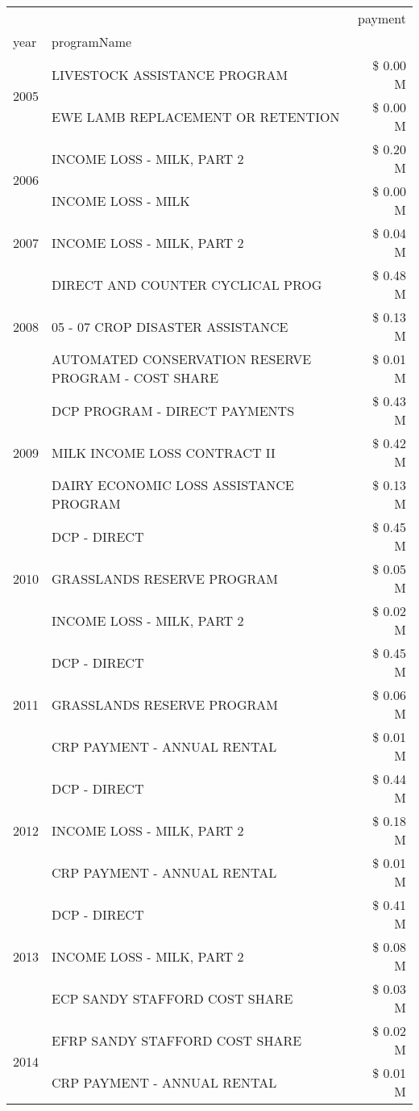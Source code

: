 \begin{tabular}{llr}
\toprule
 &  & payment \\
year & programName &  \\
\midrule
\multirow[t]{2}{*}{2005} & LIVESTOCK ASSISTANCE PROGRAM & \$ 0.00 M \\
 & EWE LAMB REPLACEMENT OR RETENTION & \$ 0.00 M \\
\cline{1-3}
\multirow[t]{2}{*}{2006} & INCOME LOSS - MILK, PART 2 & \$ 0.20 M \\
 & INCOME LOSS - MILK & \$ 0.00 M \\
\cline{1-3}
2007 & INCOME LOSS - MILK, PART 2 & \$ 0.04 M \\
\cline{1-3}
\multirow[t]{3}{*}{2008} & DIRECT AND COUNTER CYCLICAL PROG & \$ 0.48 M \\
 & 05 - 07 CROP DISASTER ASSISTANCE & \$ 0.13 M \\
 & AUTOMATED CONSERVATION RESERVE PROGRAM - COST SHARE & \$ 0.01 M \\
\cline{1-3}
\multirow[t]{3}{*}{2009} & DCP PROGRAM - DIRECT PAYMENTS & \$ 0.43 M \\
 & MILK INCOME LOSS CONTRACT II & \$ 0.42 M \\
 & DAIRY ECONOMIC LOSS ASSISTANCE PROGRAM & \$ 0.13 M \\
\cline{1-3}
\multirow[t]{3}{*}{2010} & DCP - DIRECT & \$ 0.45 M \\
 & GRASSLANDS RESERVE PROGRAM & \$ 0.05 M \\
 & INCOME LOSS - MILK, PART 2 & \$ 0.02 M \\
\cline{1-3}
\multirow[t]{3}{*}{2011} & DCP - DIRECT & \$ 0.45 M \\
 & GRASSLANDS RESERVE PROGRAM & \$ 0.06 M \\
 & CRP PAYMENT - ANNUAL RENTAL & \$ 0.01 M \\
\cline{1-3}
\multirow[t]{3}{*}{2012} & DCP - DIRECT & \$ 0.44 M \\
 & INCOME LOSS - MILK, PART 2 & \$ 0.18 M \\
 & CRP PAYMENT - ANNUAL RENTAL & \$ 0.01 M \\
\cline{1-3}
\multirow[t]{3}{*}{2013} & DCP - DIRECT & \$ 0.41 M \\
 & INCOME LOSS - MILK, PART 2 & \$ 0.08 M \\
 & ECP SANDY STAFFORD COST SHARE & \$ 0.03 M \\
\cline{1-3}
\multirow[t]{3}{*}{2014} & EFRP SANDY STAFFORD COST SHARE & \$ 0.02 M \\
 & CRP PAYMENT - ANNUAL RENTAL & \$ 0.01 M \\

\end{tabular}
